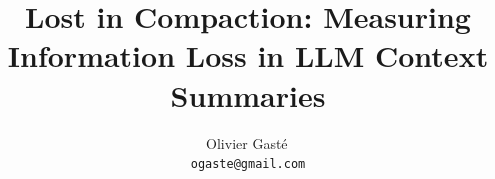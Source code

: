 \documentclass{article}
\title{Lost in Compaction: Measuring Information Loss in LLM Context Summaries}
\author{
  Olivier Gast\'e\,\orcidlink{0009-0003-3853-9298}\\
  \texttt{ogaste@gmail.com}
}
\begin{document}
\maketitle

\begin{abstract}

\end{abstract}












\appendix






\end{document}
